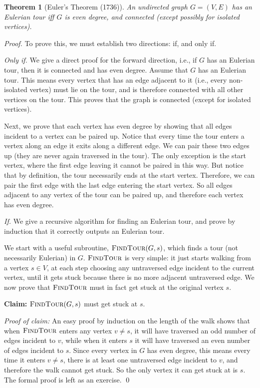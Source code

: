 \documentclass[11pt]{article}
\newcounter{thm}
\newtheorem{theorem}{Theorem}[thm]
\newcommand{\findtour}{\textsc{FindTour}}
\begin{document}
\begin{theorem}[Euler's Theorem (1736)] \label{thm:euler}
An undirected graph $G=(V,E)$ has an Eulerian
tour iff $G$ is even degree, and connected (except possibly for isolated vertices).
\end{theorem}
\begin{proof}
To prove this, we must establish two directions: if, and only if.

\emph{Only if.} We give a direct proof for the forward direction, i.e., if $G$ has an Eulerian tour, then it is connected and has even degree. 
Assume that $G$ has an Eulerian
tour. This means every vertex that has an edge adjacent to it (i.e., every
non-isolated vertex) must lie on the tour, and is
therefore connected with all other vertices on the tour. This proves that
the graph is connected (except for isolated vertices).

Next, we prove that each vertex has even degree by showing that all edges incident to 
a vertex can be paired up. Notice that every time the tour enters a vertex along an 
edge it exits along a different edge. We can pair these two edges up (they are never
again traversed in the tour). The only exception is the start vertex, where the first edge 
leaving it cannot be paired in this way. But notice that by definition, the tour necessarily ends at the 
start vertex. Therefore, we can pair the first edge with the last edge entering the start vertex. 
So all edges adjacent to any vertex of the tour can be paired up, and therefore each 
vertex has even degree.



\emph{If.} 
We give a recursive algorithm for finding an Eulerian tour, and prove by induction that it correctly outputs an Eulerian tour. 

We start with a useful subroutine, $\findtour(G, s)$, which finds a tour (not necessarily Eulerian) in $G$. $\findtour$ is 
very simple: it just starts walking from a vertex $s \in V$, at each step choosing any untraversed edge incident to the current vertex, until
it gets stuck because there is no more adjacent untraversed edge. We now prove that $\findtour$ must in fact get stuck at the original vertex $s$.

{\bf Claim:} $\findtour(G, s)$ must get stuck at $s$. 

{\em Proof of claim:} An easy proof by induction on the length of the walk shows that when $\findtour$ enters any vertex $v \neq s$, it will have 
traversed an odd number of edges incident to $v$, while when it enters $s$ it will have traversed an even number of edges incident to $s$.
Since every vertex in $G$ has even degree, this means every time it enters $v \neq s$, there is at least one untraversed edge incident to $v$, 
and therefore the walk cannot get stuck. So the only vertex it can get stuck at is $s$. The formal proof is left as an exercise.  \qed


\end{proof}
\end{document}
